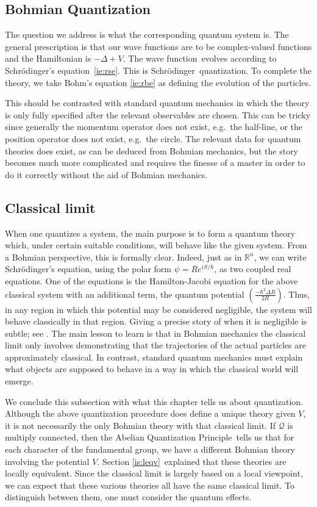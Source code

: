 \documentclass[11pt]{article}
\theoremstyle{remark}
\begin{document}
\subsection{Bohmian Quantization}
The question we address is what the corresponding quantum system
is. The general prescription is that our wave functions are to be
complex-valued functions and the Hamiltonian is 
$-\ensuremath{\Delta}+V$. The wave function\ evolves according to Schr\"odinger's equation\ \eqref{ie:rse}. 
This is Schr\"odinger\ quantization. To complete the theory, we take Bohm's
equation \eqref{ie:rbe} as defining the evolution of the particles. 

This should be contrasted with standard quantum mechanics in which the
theory is only fully specified after the relevant observables are
chosen. 
This can
be tricky since generally the momentum operator does not exist,
e.g.\ the half-line, or the position operator does not exist, e.g.\ the
circle. The relevant data for quantum theories does exist, as can be
deduced from Bohmian mechanics, but the story becomes much more
complicated and requires the finesse of a master in order to do it
correctly without the aid of Bohmian mechanics. 

\subsection{Classical limit}
When one quantizes a system, the main purpose is to form a quantum
theory which, under certain suitable conditions, will behave like the
given system. 
From a
Bohmian perspective, this is formally clear. Indeed, just as in \ensuremath{\mathbb{R}^{n}},
we can write Schr\"odinger's equation, using the polar form $\ensuremath{\psi} = Re^{iS/\ensuremath{\hbar}}$, as two
coupled real equations. One of the equations is the
Hamilton-Jacobi equation for the above classical system with an
additional term, the quantum potential
$(\frac{-\ensuremath{\hbar}^2\ensuremath{\Delta} R}{2R})$. Thus, in any region in which
 this potential may be
considered negligible, the system will behave classically in that
region. Giving a
precise story of when it is negligible is subtle; see \cite{ADGZ02}. 
The main lesson to learn is that in Bohmian mechanics 
the classical limit only involves
demonstrating
 that the trajectories of the actual particles are approximately classical. In
contrast, standard quantum mechanics must explain what objects are
supposed to behave in a way in which the classical world will emerge. 

We conclude this subsection with what this chapter tells us about 
quantization. Although the above quantization procedure does define a
unique theory given $V$, it is not necessarily 
the only Bohmian  theory with that classical limit. 
If $\ensuremath{\mathcal{Q}}$ is multiply connected, then the Abelian Quantization Principle\ tells us that for
each character of the fundamental group, 
we have a different Bohmian theory involving the
potential $V$. Section {\ref{is:leqv}}\ explained that  these theories
are locally equivalent. Since the classical limit is largely based on
a local viewpoint, we can expect that these various theories all have
the same classical limit. To distinguish between them, one must
consider the quantum effects. 
\end{document}
